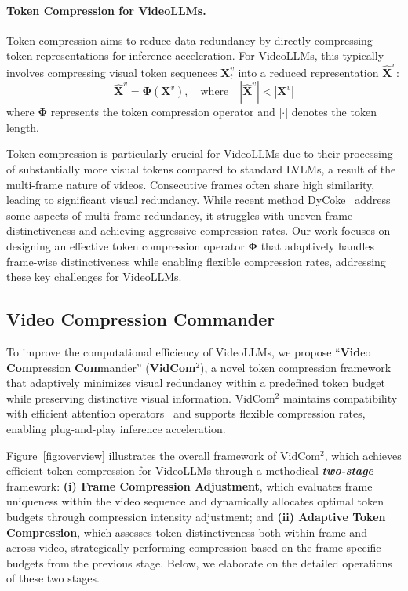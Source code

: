 \paragraph{Token Compression for VideoLLMs.}


Token compression aims to reduce data redundancy by directly compressing token representations for inference acceleration. For VideoLLMs, this typically involves compressing visual token sequences $\mathbf{X}_{t}^v$ into a reduced representation $\mathbf{\hat{X}}^v$:
\begin{equation}
\mathbf{\hat{X}}^v = \boldsymbol{\Phi}(\mathbf{X}^v), \quad \text{where} \quad |\mathbf{\hat{X}}^v| < |\mathbf{X}^v|
\end{equation}
where $\boldsymbol{\Phi}$ represents the token compression operator and $|\cdot|$ denotes the token length.

Token compression is particularly crucial for VideoLLMs due to their processing of substantially more visual tokens compared to standard LVLMs, a result of the multi-frame nature of videos. Consecutive frames often share high similarity, leading to significant visual redundancy. While recent method DyCoke~\cite{tao2024dycoke} address some aspects of multi-frame redundancy, it struggles with uneven frame distinctiveness and achieving aggressive compression rates. Our work focuses on designing an effective token compression operator $\boldsymbol{\Phi}$ that adaptively handles frame-wise distinctiveness while enabling flexible compression rates, addressing these key challenges for VideoLLMs.




\subsection{Video Compression Commander}


To improve the computational efficiency of VideoLLMs, we propose ``\textbf{Vid}eo \textbf{Com}pression \textbf{Com}mander'' (\textbf{VidCom$^2$}), a novel token compression framework that adaptively minimizes visual redundancy within a predefined token budget while preserving distinctive visual information. VidCom$^2$ maintains compatibility with efficient attention operators~\cite{Dao2022:FlashAttention,daoFlashAttention-2} and supports flexible compression rates, enabling plug-and-play inference acceleration.


Figure~\ref{fig:overview} illustrates the overall framework of VidCom$^2$, which achieves efficient token compression for VideoLLMs through a methodical \textbf{\emph{two-stage}} framework: \textbf{(i) Frame Compression Adjustment}, which evaluates frame uniqueness within the video sequence and dynamically allocates optimal token budgets through compression intensity adjustment; and \textbf{(ii) Adaptive Token Compression}, which assesses token distinctiveness both within-frame and across-video, strategically performing compression based on the frame-specific budgets from the previous stage. Below, we elaborate on the detailed operations of these two stages.


